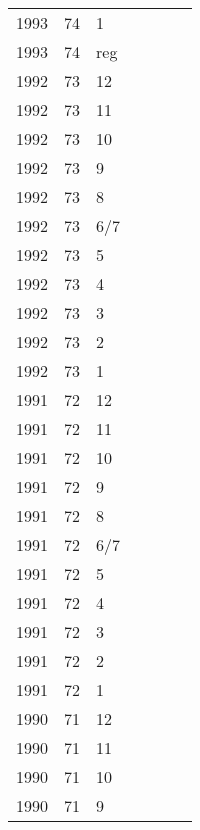 \begin{longtable}{ |l|l|l|l|p{2.7cm}|l|p{2cm}| }
 1993 & 74 &     1 &         &                &  & \\
 1993 & 74 &   reg &         &                &  & \\
 1992 & 73 &    12 &         &                &  & \\
 1992 & 73 &    11 &         &                &  & \\
 1992 & 73 &    10 &         &                &  & \\
 1992 & 73 &     9 &         &                &  & \\
 1992 & 73 &     8 &         &                &  & \\
 1992 & 73 &   6/7 &         &                &  & \\
 1992 & 73 &     5 &         &                &  & \\
 1992 & 73 &     4 &         &                &  & \\
 1992 & 73 &     3 &         &                &  & \\
 1992 & 73 &     2 &         &                &  & \\
 1992 & 73 &     1 &         &                &  & \\
 1991 & 72 &    12 &         &                &  & \\
 1991 & 72 &    11 &         &                &  & \\
 1991 & 72 &    10 &         &                &  & \\
 1991 & 72 &     9 &         &                &  & \\
 1991 & 72 &     8 &         &                &  & \\
 1991 & 72 &   6/7 &         &                &  & \\
 1991 & 72 &     5 &         &                &  & \\
 1991 & 72 &     4 &         &                &  & \\
 1991 & 72 &     3 &         &                &  & \\
 1991 & 72 &     2 &         &                &  & \\
 1991 & 72 &     1 &         &                &  & \\
 1990 & 71 &    12 &         &                &  & \\
 1990 & 71 &    11 &         &                &  & \\
 1990 & 71 &    10 &         &                &  & \\
 1990 & 71 &     9 &         &                &  & \\

\end{longtable}

